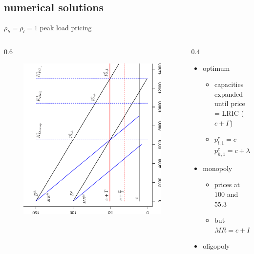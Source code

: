 \subsection{numerical solutions}

\begin{frame} {$\rho_h = \rho_l = 1$ peak load pricing}
					
\begin{columns}
\begin{column} {0.6\textwidth}
\begin{figure}[h]
\centering
\includegraphics[width=1.0\textwidth, angle=270]{11}
    \label{fig:1}            
\end{figure}
\end{column}

\begin{column} {0.4\textwidth}

\begin{itemize}
	\item optimum
	
\begin{itemize}
	\item capacities expanded until price = LRIC ($c+ \Gamma$)
	\item $p^c_{l,1} = c$ $p^c_{h,1} = c + \lambda_{i}^{h,1}$
\end{itemize}
  \item monopoly
\begin{itemize}
  \item prices at $100$ and $55.3$
  \item but $MR = c+ \Gamma$
\end{itemize}
  \item oligopoly
  

\end{itemize}
\end{column}
\end{columns}
\end{frame}
